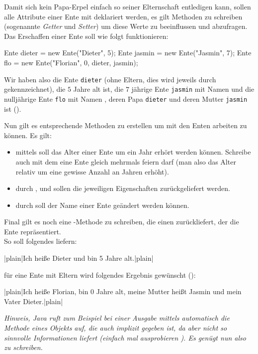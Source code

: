 \documentclass[table]{sopra-base}
\let\T\texttt
\begin{document}
Damit sich kein Papa-Erpel einfach so seiner Elternschaft entledigen kann, sollen alle Attribute einer Ente mit  deklariert werden, es gilt Methoden zu schreiben (sogenannte \emph{Getter} und \emph{Setter}) um diese Werte zu beeinflussen und abzufragen. Das Erschaffen einer Ente soll wie folgt funktionieren:
\begin{java*}[morekeywords={[3]{Ente}}]
Ente dieter = new Ente("Dieter", 5);
Ente jasmin = new Ente("Jasmin", 7);
Ente flo    = new Ente("Florian", 0, dieter, jasmin);
\end{java*}
Wir haben also die Ente \T{dieter} (ohne Eltern, dies wird jeweils durch  gekennzeichnet), die $5$ Jahre alt ist, die $7$ jährige Ente \T{jasmin} mit Namen  und die nulljährige Ente \T{flo} mit Namen , deren Papa \T{dieter} und deren Mutter \T{jasmin} ist ().\par{}
Nun gilt es entsprechende Methoden zu erstellen um mit den Enten arbeiten zu können. Es gilt:
\begin{itemize}[nolistsep]
    \item mittels  soll das Alter einer Ente um ein Jahr erhört werden können. Schreibe auch  mit dem eine Ente gleich mehrmals feiern darf (man also das Alter relativ um eine gewisse Anzahl an Jahren erhöht).
    \item durch ,  und  sollen die jeweiligen Eigenschaften zurückgeliefert werden.
    \item durch  soll der Name einer Ente geändert werden können.
\end{itemize}
Final gilt es noch eine -Methode zu schreiben, die einen  zurückliefert, der die Ente repräsentiert.\\
So soll  folgendes liefern:
{\small\begin{plainvoid}
|plain|Ich heiße Dieter und bin 5 Jahre alt.|plain|
\end{plainvoid}}
für eine Ente mit Eltern wird folgendes Ergebnis gewünscht ():
{\small\begin{plainvoid}
|plain|Ich heiße Florian, bin 0 Jahre alt, meine Mutter heißt Jasmin und mein Vater Dieter.|plain|
\end{plainvoid}}
\textit{Hinweis, Java ruft zum Beispiel bei einer Ausgabe mittels  automatisch die  Methode eines Objekts auf, die auch implizit gegeben ist, da aber nicht so sinnvolle Informationen liefert (einfach mal ausprobieren \Laughey). Es genügt nun also  zu schreiben.}
\end{document}
